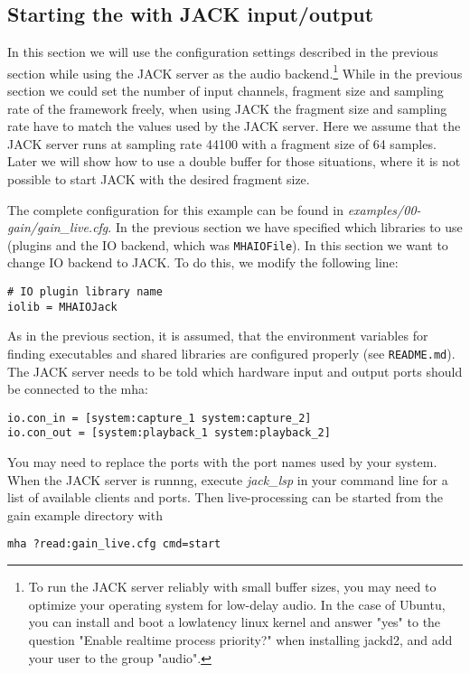 \subsection{Starting the \mhad{} with JACK input/output}%
\label{sec:example_jack}%
%
%
%

In this section we will use the configuration settings described in
the previous section while using the JACK server as the audio
backend.\footnote{To run the JACK server reliably with small buffer
  sizes, you may need to optimize your operating system for low-delay
  audio. In the case of Ubuntu, you can install and boot a lowlatency
  linux kernel and answer "yes" to the question "Enable realtime process
  priority?" when installing jackd2, and add your user to the group
  "audio".
}
%
While in the previous section
we could  set the number of 
input channels, fragment size and sampling rate of the framework freely,
when using JACK the fragment size
and sampling rate have to match the values used by the JACK server.
%
Here we assume that the JACK server runs at sampling rate 44100 with a
fragment size of 64 samples.
%
Later we will show how to use a double buffer for those
situations, where it is not possible to start JACK with the desired
fragment size. 

The complete configuration for this example can be found in
\emph{examples/00-gain/gain\_live.cfg}.
In the previous section we have specified which libraries to use
(plugins and the IO backend, which was \verb!MHAIOFile!). In this section 
we want to change IO backend to JACK. 
%
To do this, we modify the following line:
\begin{verbatim}
# IO plugin library name
iolib = MHAIOJack
\end{verbatim}
%
As in the previous section, it is assumed, that the environment
variables for finding executables and shared libraries are configured
properly (see \verb!README.md!).
The JACK server needs to be told which hardware input and output ports should be
connected to the mha:
\begin{verbatim}
io.con_in = [system:capture_1 system:capture_2]
io.con_out = [system:playback_1 system:playback_2]
\end{verbatim}
You may need to replace the ports with the port names used
by your system.
When the JACK server is runnng, execute \emph{jack\_lsp} in your command
line for a list of available clients and ports.
%
Then \mha{} live-processing can be started from the gain example directory with
\begin{verbatim}
mha ?read:gain_live.cfg cmd=start
\end{verbatim}

